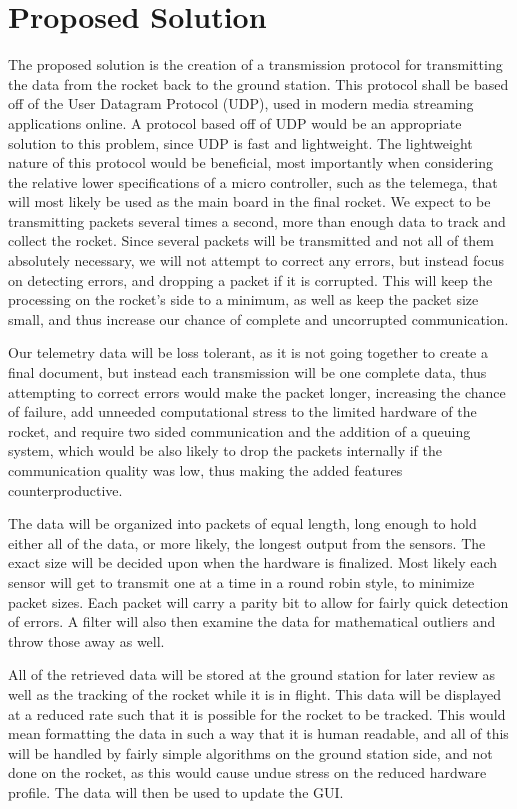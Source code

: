 \documentclass[onecolumn, draftclsnofoot,10pt, compsoc]{IEEEtran}
\begin{document}
\section{Proposed Solution}
The proposed solution is the creation of a transmission protocol for transmitting the data from the rocket back to the ground station. This protocol shall be based off of the User Datagram Protocol (UDP), used in modern media streaming applications online. A protocol based off of UDP would be an appropriate solution to this problem, since UDP is fast and lightweight. The lightweight nature of this protocol would be beneficial, most importantly when considering the relative lower specifications of a micro controller, such as the telemega, that will most likely be used as the main board in the final rocket. We expect to be transmitting packets several times a second, more than enough data to track and collect the rocket. Since several packets will be transmitted and not all of them absolutely necessary, we will not attempt to correct any errors, but instead focus on detecting errors, and dropping a packet if it is corrupted. This will keep the processing on the rocket’s side to a minimum, as well as keep the packet size small, and thus increase our chance of complete and uncorrupted communication.  \par
Our telemetry data will be loss tolerant, as it is not going together to create a final document, but instead each transmission will be one complete data, thus attempting to correct errors would make the packet longer, increasing the chance of failure, add unneeded computational stress to the limited hardware of the rocket, and require two sided communication and the addition of a queuing system, which would be also likely to drop the packets internally if the communication quality was low, thus making the added features counterproductive. \par
The data will be organized into packets of equal length, long enough to hold either all of the data, or more likely, the longest output from the sensors. The exact size will be decided upon when the hardware is finalized. Most likely each sensor will get to transmit one at a time in a round robin style, to minimize packet sizes. Each packet will carry a parity bit to allow for fairly quick detection of errors. A filter will also then examine the data for mathematical outliers and throw those away as well. \par 
All of the retrieved data will be stored at the ground station for later review as well as the tracking of the rocket while it is in flight. This data will be displayed at a reduced rate such that it is possible for the rocket to be tracked. This would mean formatting the data in such a way that it is human readable, and all of this will be handled by fairly simple algorithms on the ground station side, and not done on the rocket, as this would cause undue stress on the reduced hardware profile. The data will then be used to update the GUI. \par
\end{document}
